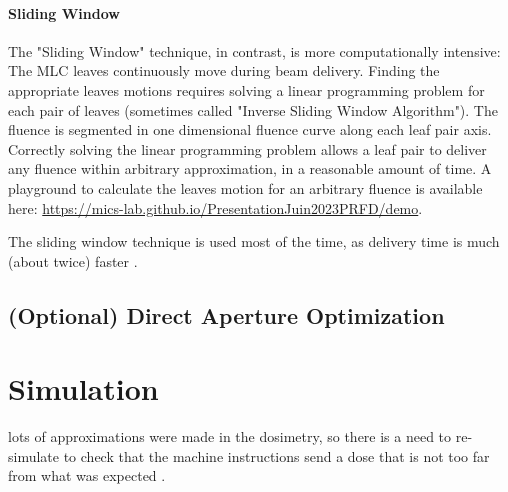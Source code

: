\paragraph[SW]{Sliding Window}
The "Sliding Window" technique, in contrast, is more computationally intensive:
The MLC leaves continuously move during beam delivery.
Finding the appropriate leaves motions requires solving a linear programming problem for each pair of leaves (sometimes called "Inverse Sliding Window Algorithm").
The fluence is segmented in one dimensional fluence curve along each leaf pair axis.
Correctly solving the linear programming problem allows a leaf pair to deliver any fluence within arbitrary approximation, in a reasonable amount of time.
A playground to calculate the leaves motion for an arbitrary fluence is available here:
\url{https://mics-lab.github.io/PresentationJuin2023PRFD/demo}.

The sliding window technique is used most of the time, as delivery time is much (about twice) faster \cite{Ning2003}.

\subsection[DAO]{(Optional) Direct Aperture Optimization}






\section{Simulation}
lots of approximations were made in the dosimetry, so there is a need to re-simulate to check that the machine instructions send a dose that is not too far from what was expected .






